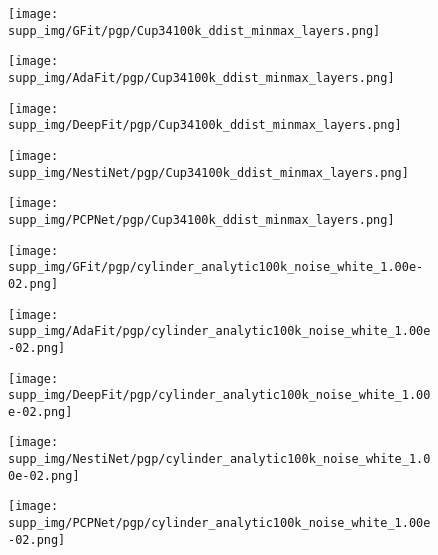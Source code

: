 \documentclass[runningheads]{llncs}
\begin{document}
\begin{figure*}
\begin{subfigure}{0.15\linewidth}
		\centering
		\texttt{[image: supp\_img/GFit/pgp/Cup34100k\_ddist\_minmax\_layers.png]}
\end{subfigure}
	\hspace{0.1cm}
	\begin{subfigure}{0.15\linewidth}
		\centering
		\texttt{[image: supp\_img/AdaFit/pgp/Cup34100k\_ddist\_minmax\_layers.png]}
\end{subfigure}
	\hspace{0.1cm}
	\begin{subfigure}{0.17\linewidth}
		\centering
		\texttt{[image: supp\_img/DeepFit/pgp/Cup34100k\_ddist\_minmax\_layers.png]}
\end{subfigure}
	\hspace{0.1cm}
	\begin{subfigure}{0.17\linewidth}
		\centering
		\texttt{[image: supp\_img/NestiNet/pgp/Cup34100k\_ddist\_minmax\_layers.png]}
\end{subfigure}
	\hspace{0.1cm}
	\begin{subfigure}{0.17\linewidth}
		\centering
		\texttt{[image: supp\_img/PCPNet/pgp/Cup34100k\_ddist\_minmax\_layers.png]}
\end{subfigure}
	
\begin{subfigure}{0.15\linewidth}
		\centering
		\texttt{[image: supp\_img/GFit/pgp/cylinder\_analytic100k\_noise\_white\_1.00e-02.png]}
\end{subfigure}
	\hspace{0.1cm}
	\begin{subfigure}{0.15\linewidth}
		\centering
		\texttt{[image: supp\_img/AdaFit/pgp/cylinder\_analytic100k\_noise\_white\_1.00e-02.png]}
\end{subfigure}
	\hspace{0.1cm}
	\begin{subfigure}{0.17\linewidth}
		\centering
		\texttt{[image: supp\_img/DeepFit/pgp/cylinder\_analytic100k\_noise\_white\_1.00e-02.png]}
\end{subfigure}
	\hspace{0.1cm}
	\begin{subfigure}{0.17\linewidth}
		\centering
		\texttt{[image: supp\_img/NestiNet/pgp/cylinder\_analytic100k\_noise\_white\_1.00e-02.png]}
\end{subfigure}
	\hspace{0.1cm}
	\begin{subfigure}{0.17\linewidth}
		\centering
		\texttt{[image: supp\_img/PCPNet/pgp/cylinder\_analytic100k\_noise\_white\_1.00e-02.png]}
\end{subfigure}
	

\end{figure*}
\end{document}
